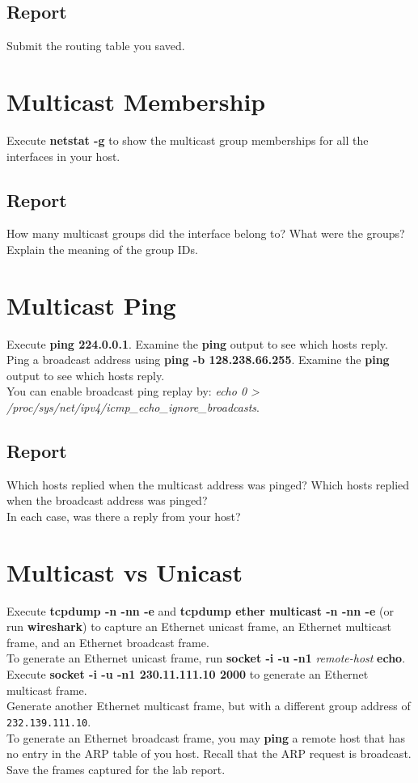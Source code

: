 \documentclass{../UTNetLab}
\begin{document}
    \subsection*{Report}
    Submit the routing table you saved.

\section{Multicast Membership}
    Execute \textbf{netstat -g} to show the multicast group memberships for all the interfaces in your host.
    \subsection*{Report}
    How many multicast groups did the interface belong to? What were the groups? Explain the meaning of the group IDs.

\section{Multicast Ping}
    Execute \textbf{ping 224.0.0.1}.
    Examine the \textbf{ping} output to see which hosts reply. \\
    Ping a broadcast address using \textbf{ping -b 128.238.66.255}.
    Examine the \textbf{ping} output to see which hosts reply. \\
    You can enable broadcast ping replay by: \textit{echo 0 > /proc/sys/net/ipv4/icmp\_echo\_ignore\_broadcasts}.
    \subsection*{Report}
    Which hosts replied when the multicast address was pinged?
    Which hosts replied when the broadcast address was pinged? \\
    In each case, was there a reply from your host?

\section{Multicast vs Unicast}
    Execute \textbf{tcpdump -n -nn -e} and \textbf{tcpdump ether multicast -n -nn -e} (or run \textbf{wireshark}) to capture an Ethernet unicast frame, an Ethernet multicast frame, and an Ethernet broadcast frame. \\
    To generate an Ethernet unicast frame, run \textbf{socket -i -u -n1} \textit{remote-host} \textbf{echo}. \\
    Execute \textbf{socket -i -u -n1 230.11.111.10 2000} to generate an Ethernet multicast frame. \\
    Generate another Ethernet multicast frame, but with a different group address of \texttt{232.139.111.10}. \\
    To generate an Ethernet broadcast frame, you may \textbf{ping} a remote host that has no entry in the ARP table of you host.
    Recall that the ARP request is broadcast. \\
    Save the frames captured for the lab report.
\end{document}
